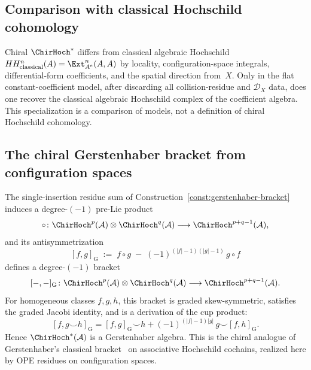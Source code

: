 \subsection{Comparison with classical Hochschild cohomology}

\begin{remark}\label{rem:chiral-vs-classical-hochschild}
Chiral $\ChirHoch^*$ differs from classical algebraic Hochschild
$HH^n_{\text{classical}}(A)=\Ext^n_{A^e}(A,A)$ by locality,
configuration-space integrals, differential-form coefficients, and the
spatial direction from~$X$. Only in the flat constant-coefficient
model, after discarding all collision-residue and $\mathcal D_X$
data, does one recover the classical algebraic Hochschild complex of
the coefficient algebra. This specialization is a comparison of
models, not a definition of chiral Hochschild cohomology.
\end{remark}

\subsection{The chiral Gerstenhaber bracket from configuration spaces}

\begin{theorem}\label{thm:gerstenhaber-structure}
The single-insertion residue sum of
Construction~\textup{\ref{const:gerstenhaber-bracket}}
induces a degree-$(-1)$ pre-Lie product
\[
\circ \colon
\ChirHoch^p(\mathcal{A}) \otimes \ChirHoch^q(\mathcal{A})
\longrightarrow
\ChirHoch^{p+q-1}(\mathcal{A}),
\]
and its antisymmetrization
\[
[f,g]_{\mathrm G}
\;:=\;
f \circ g
\;-\;
(-1)^{(|f|-1)(|g|-1)}\, g \circ f
\]
defines a degree-$(-1)$ bracket
\[
[-,-]_{\mathrm G} \colon
\ChirHoch^p(\mathcal{A}) \otimes \ChirHoch^q(\mathcal{A})
\longrightarrow
\ChirHoch^{p+q-1}(\mathcal{A}).
\]
For homogeneous classes $f,g,h$, this bracket is graded
skew-symmetric, satisfies the graded Jacobi identity, and is a
derivation of the cup product:
\[
[f, g \smile h]_{\mathrm G}
=
[f,g]_{\mathrm G}\smile h
+
(-1)^{(|f|-1)|g|}\, g \smile [f,h]_{\mathrm G}.
\]
Hence $\ChirHoch^*(\mathcal{A})$ is a Gerstenhaber algebra.
This is the chiral analogue of Gerstenhaber's classical
bracket~\cite{Ger63} on associative Hochschild cochains, realized
here by OPE residues on configuration spaces.
\end{theorem}

